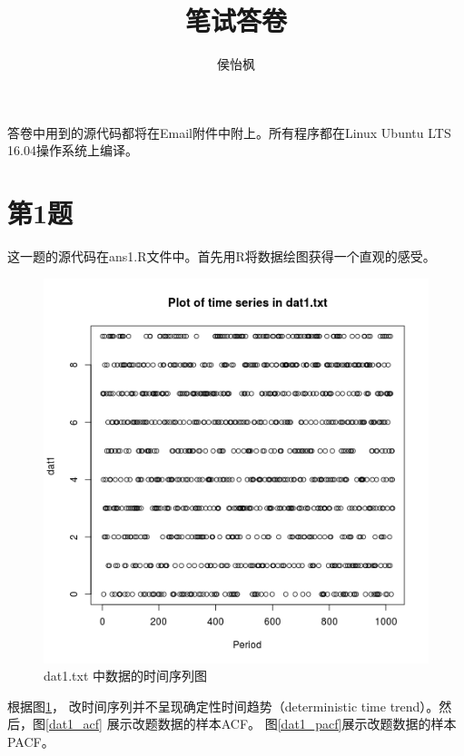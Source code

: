 \documentclass[11pt]{article}
\title{笔试答卷}
\author{侯怡枫}
\begin{document}
\maketitle

答卷中用到的源代码都将在Email附件中附上。所有程序都在Linux Ubuntu LTS 16.04操作系统上编译。

\section*{第1题}

这一题的源代码在ans1.R文件中。首先用R将数据绘图获得一个直观的感受。
\begin{figure}[h]
	\centering
	\includegraphics[scale=0.4]{dat1_plot.png}
	\caption{dat1.txt 中数据的时间序列图}
\label{dat1_plot}
\end{figure}

根据图\ref{dat1_plot}， 改时间序列并不呈现确定性时间趋势（deterministic time trend）。然后，图\ref{dat1_acf} 展示改题数据的样本ACF。 图\ref{dat1_pacf}展示改题数据的样本PACF。
\end{document}
